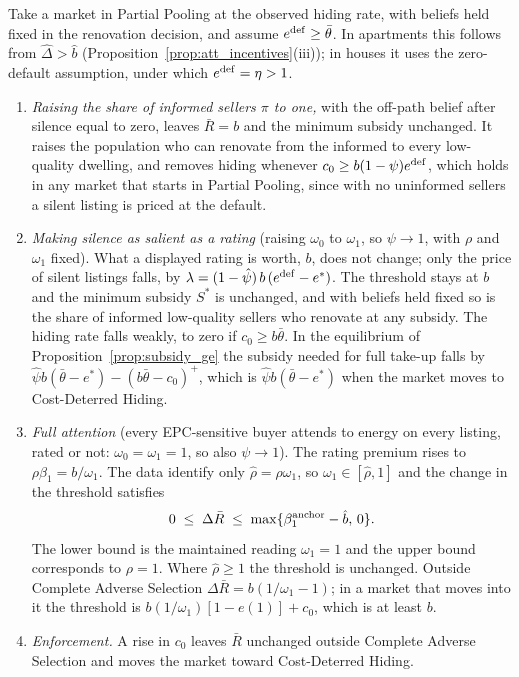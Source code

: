 \documentclass[10pt,letterpaper]{bp-template-concise}
\begin{document}
\begin{proposition}[Instruments]
\label{prop:instruments}
Take a market in Partial Pooling at the observed hiding rate, with beliefs held fixed in the renovation decision, and assume $e^{\rm def}\ge\bar\theta$. In apartments this follows from $\hat\Delta>\hat b$ (Proposition~\ref{prop:att_incentives}(iii)); in houses it uses the zero-default assumption, under which $e^{\rm def}=\eta>1$.
\begin{enumerate}[label=(\roman*)]
    \item \emph{Raising the share of informed sellers $\pi$ to one,} with the off-path belief after silence equal to zero, leaves $\bar R=b$ and the minimum subsidy unchanged. It raises the population who can renovate from the informed to every low-quality dwelling, and removes hiding whenever $c_0\ge b(1-\psi)e^{\rm def}$, which holds in any market that starts in Partial Pooling, since with no uninformed sellers a silent listing is priced at the default.
    \item \emph{Making silence as salient as a rating} (raising $\omega_0$ to $\omega_1$, so $\psi\to1$, with $\rho$ and $\omega_1$ fixed). What a displayed rating is worth, $b$, does not change; only the price of silent listings falls, by $\lambda=(1-\hat\psi)\,b\,(e^{\rm def}-e^*)$. The threshold stays at $b$ and the minimum subsidy $S^*$ is unchanged, and with beliefs held fixed so is the share of informed low-quality sellers who renovate at any subsidy. The hiding rate falls weakly, to zero if $c_0\ge b\bar\theta$. In the equilibrium of Proposition~\ref{prop:subsidy_ge} the subsidy needed for full take-up falls by $\hat\psi b(\bar\theta-e^*)-(b\bar\theta-c_0)^+$, which is $\hat\psi b(\bar\theta-e^*)$ when the market moves to Cost-Deterred Hiding.
    \item \emph{Full attention} (every EPC-sensitive buyer attends to energy on every listing, rated or not: $\omega_0=\omega_1=1$, so also $\psi\to1$). The rating premium rises to $\rho\beta_1=b/\omega_1$. The data identify only $\hat\rho=\rho\omega_1$, so $\omega_1\in[\hat\rho,1]$ and the change in the threshold satisfies
    \[
        0\;\le\;\Delta\bar R\;\le\;\max\{\beta_1^{\rm anchor}-\hat b,\,0\}.
    \]
    The lower bound is the maintained reading $\omega_1=1$ and the upper bound corresponds to $\rho=1$. Where $\hat\rho\ge1$ the threshold is unchanged. Outside Complete Adverse Selection $\Delta\bar R=b(1/\omega_1-1)$; in a market that moves into it the threshold is $b(1/\omega_1)[1-e(1)]+c_0$, which is at least $b$.
    \item \emph{Enforcement.} A rise in $c_0$ leaves $\bar R$ unchanged outside Complete Adverse Selection and moves the market toward Cost-Deterred Hiding.
\end{enumerate}
\end{proposition}
\end{document}
